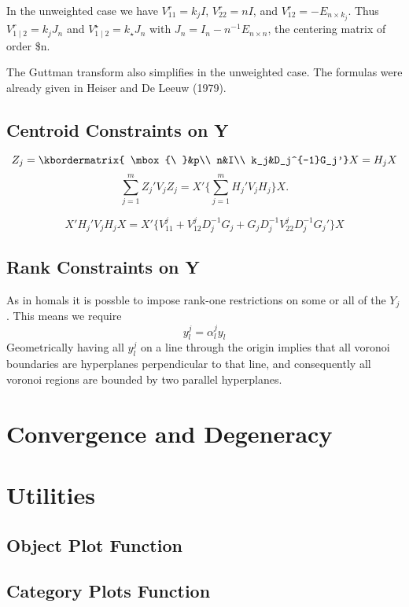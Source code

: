 \documentclass[
  12pt,
]{article}
\begin{document}
In the unweighted case we have \(V_{11}^r=k_jI\), \(V_{22}^r=nI\), and
\(V_{12}^r=-E_{n\times k_j}\). Thus
\(V_{1\mid2}^r=k_jJ_n\) and \(V_{1\mid 2}^\star=k_\star J_n\)
with \(J_n=I_n-n^{-1}E_{n\times n}\), the centering matrix of order \$n.

The Guttman transform also simplifies in the unweighted case. The formulas were already given in Heiser and De Leeuw (1979).

\subsection{Centroid Constraints on Y}\label{centroid-constraints-on-y}

\[
Z_j=
\kbordermatrix{
\mbox{\ }&p\\
n&I\\
k_j&D_j^{-1}G_j'}X=H_jX
\]
\[
\sum_{j=1}^m Z_j'V_jZ_j=X'\{\sum_{j=1}^mH_j'V_jH_j\}X.
\]

\[
X'H_j'V_jH_jX=X'\{V_{11}^j+V_{12}^jD_j^{-1}G_j+G_jD_j^{-1}V_{22}^jD_j^{-1}G_j'\}X
\]

\subsection{Rank Constraints on Y}\label{rank-constraints-on-y}

As in homals it is possble to impose rank-one restrictions on some or all of the \(Y_j\). This means we require
\[
y_l^j=\alpha_{l}^jy_l^{\ }{}
\]
Geometrically having all \(y_l^j\) on a line through the origin implies that
all voronoi boundaries are hyperplanes perpendicular to that line, and consequently all voronoi regions are bounded by two parallel hyperplanes.

\section{Convergence and Degeneracy}\label{convergence-and-degeneracy}

\section{Utilities}\label{utilities}

\subsection{Object Plot Function}\label{object-plot-function}

\subsection{Category Plots Function}\label{category-plots-function}
\end{document}
